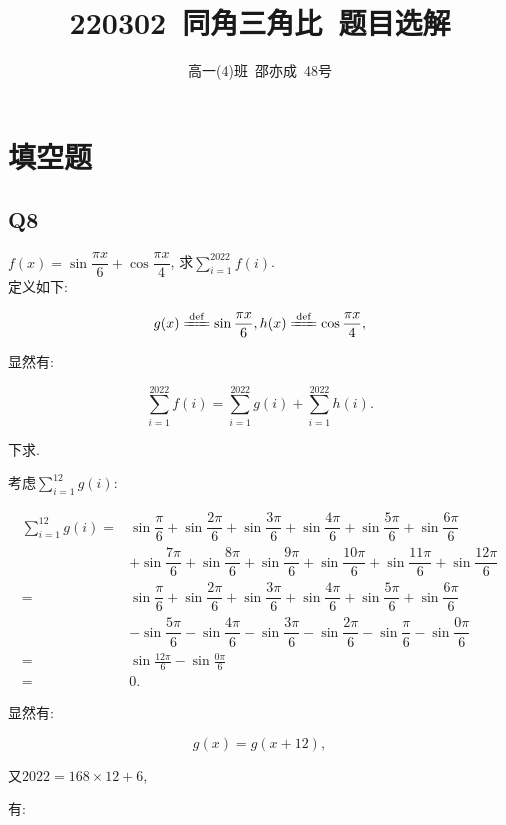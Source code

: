 \documentclass[8pt]{article}
\author{高一(4)班\ 邵亦成\ 48号}
\title{220302\ 同角三角比\ 题目选解}
\date{}
\begin{document}
	\maketitle

	\section{填空题}
		\subsection{Q8}
			 $f(x)=\sin \dfrac{\pi x}{6} + \cos \dfrac{\pi x}{4}$, 求$\displaystyle \sum_{i=1}^{2022} f(i)$.
				~\\

				定义如下:

				$$
				g(x) \ddef \sin \dfrac{\pi x}{6}, h(x) \ddef \cos \dfrac{\pi x}{4},
				$$

				显然有:

				$$\sum_{i=1}^{2022} f(i) = \sum_{i=1}^{2022} g(i) + \sum_{i=1}^{2022} h(i).$$

				下求.

				考虑$\displaystyle \sum_{i=1}^{12} g(i)$:

				\begin{align*}
				\sum_{i=1}^{12} g(i) = & \sin \dfrac {\pi}{6} + \sin \dfrac{2 \pi}{6} + \sin \dfrac{3 \pi}{6} + \sin \dfrac{4 \pi}{6} + \sin \dfrac{5 \pi}{6} + \sin \dfrac{6 \pi}{6}\\
				& + \sin \dfrac{7 \pi}{6} + \sin \dfrac{8 \pi}{6} + \sin \dfrac{9 \pi}{6} + \sin \dfrac{10 \pi}{6} + \sin \dfrac{11 \pi}{6} + \sin \dfrac{12 \pi}{6}\\
				= & \sin \dfrac {\pi}{6} + \sin \dfrac{2 \pi}{6} + \sin \dfrac{3 \pi}{6} + \sin \dfrac{4 \pi}{6} + \sin \dfrac{5 \pi}{6} + \sin \dfrac{6 \pi}{6}\\
				& - \sin \dfrac{5 \pi}{6} - \sin \dfrac{4 \pi}{6} - \sin \dfrac{3 \pi}{6} - \sin \dfrac{2 \pi}{6} - \sin \dfrac{\pi}{6} - \sin \dfrac{0 \pi}{6}\\
				= & \sin \frac{12 \pi}{6} - \sin \frac{0 \pi}{6}\\
				= & 0.
				\end{align*}

				显然有:

				$$g(x)=g(x+12),$$

				又$2022=168 \times 12 + 6$,

				有:
\end{document}
